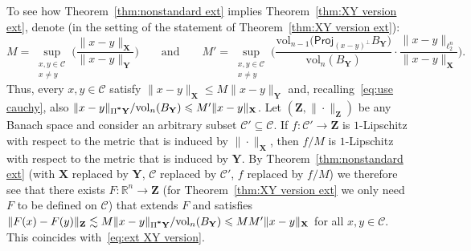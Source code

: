 \documentclass[11pt,reqno]{amsart}
\renewcommand{\le}{\leqslant}
\newcommand{\proj}{\mathsf{Proj}}
\newcommand{\X}{\mathbf X}
\newcommand{\Y}{\mathbf Y}
\newcommand{\R}{\mathbb R}
\theoremstyle{remark}
\renewcommand{\subset}{\subseteq}
\newcommand{\bfZ}{\mathbf{Z}}
\newcommand{\sub}{\mathscr{C}}
\newcommand{\vol}{\mathrm{vol}}
\renewcommand{\1}{\mathbf 1}
\begin{document}
To see how Theorem~\ref{thm:nonstandard ext}  implies Theorem~\ref{thm:XY version ext},  denote (in the setting of the statement of Theorem~\ref{thm:XY version ext}):
\begin{equation}\label{eq:MM' notation}
M=\sup_{\substack{x,y\in \sub\\x\neq y}}\bigg(\frac{\|x-y\|_{\X}}{\|x-y\|_{\Y}}\bigg)\qquad \mathrm{and}\qquad M'=\sup_{\substack{x,y\in \sub\\x\neq y}} \bigg( \frac{\vol_{n-1}\big(\proj_{(x-y)^\perp}B_{\Y}\big)}{\vol_n(B_{\Y})}\cdot \frac{\|x-y\|_{\ell_2^n}}{\|x-y\|_{\X}}\bigg).
\end{equation}
Thus, every $x,y\in \sub$ satisfy $\|x-y\|_\X\le M\|x-y\|_\Y$ and, recalling~\eqref{eq:use cauchy}, also $\|x-y\|_{\Pi^{\textbf *}\Y}/\vol_n(B_\Y)\le M'\|x-y\|_\X$. Let $(\bfZ,\|\cdot\|_\bfZ)$ be any Banach space and consider an arbitrary subset $\sub'\subset \sub$. If $f:\sub'\to \bfZ$ is $1$-Lipschitz with respect to the metric that is induced by $\|\cdot\|_\X$, then $f/M$ is $1$-Lipschitz with respect to the metric that is induced by $\Y$. By Theorem~\ref{thm:nonstandard ext} (with $\X$ replaced by $\Y$, $\sub$ replaced by $\sub'$, $f$ replaced by $f/M$) we therefore see that there exists $F:\R^n\to \bfZ$ (for Theorem~\ref{thm:XY version ext} we only need $F$ to be defined on $\sub$) that extends $F$ and satisfies $\|F(x)-F(y)\|_\bfZ\lesssim M \|x-y\|_{\Pi^{\textbf *}\Y}/\vol_n(B_\Y)\le MM'\|x-y\|_\X$ for all $x,y\in \sub$. This coincides with~\eqref{eq:ext XY version}.
\end{document}

